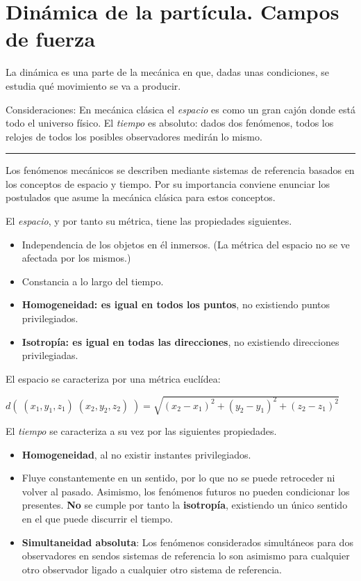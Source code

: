 \chapter{Dinámica de la partícula. Campos de fuerza}	

La dinámica es una parte de la mecánica en que, dadas unas condiciones, se estudia qué movimiento se va a producir.

Consideraciones: En mecánica clásica el \emph{espacio} es como un gran cajón donde está todo el universo físico. El \emph{tiempo} es absoluto: dados dos fenómenos, todos los relojes de todos los posibles observadores medirán lo mismo.

\rule{150pt}{0.4pt} 

Los fenómenos mecánicos se describen mediante sistemas de referencia basados en los conceptos de espacio y tiempo. Por su importancia conviene enunciar los postulados que asume la mecánica clásica para estos conceptos. 

El \emph{espacio}, y por tanto su métrica, tiene las propiedades siguientes. 
\begin{itemize}
\vspace{-2mm}\item Independencia de los objetos en él inmersos. (La métrica del espacio no se ve afectada por los mismos.) 
\vspace{-2mm}\item Constancia a lo largo del tiempo. 
\vspace{-2mm}\item \textbf{Homogeneidad: es igual en todos los puntos}, no existiendo puntos privilegiados. 
\vspace{-2mm}\item \textbf{Isotropía: es igual en todas las direcciones}, no existiendo direcciones privilegiadas. 
\end{itemize}
El espacio se caracteriza por una métrica euclídea:
 
$d(\;(x_1,y_1,z_1)\;(x_2,y_2,z_2)\;)=\sqrt{(x_2-x_1)^2+(y_2-y_1)^2+(z_2-z_1)^2}$ 

El \emph{tiempo} se caracteriza a su vez por las siguientes propiedades. 
\begin{itemize}
\vspace{-2mm}\item \textbf{Homogeneidad}, al no existir instantes privilegiados. 
\vspace{-2mm}\item Fluye constantemente en un sentido, por lo que no se puede retroceder ni volver al pasado. Asimismo, los fenómenos futuros no pueden condicionar los presentes. \textbf{No} se cumple por tanto la \textbf{isotropía}, existiendo un único sentido en el que puede discurrir el tiempo. 
\vspace{-2mm}\item \textbf{Simultaneidad absoluta}: Los fenómenos considerados simultáneos para dos observadores en sendos sistemas de referencia lo son asimismo para cualquier otro observador ligado a cualquier otro sistema de referencia. 
\end{itemize}

